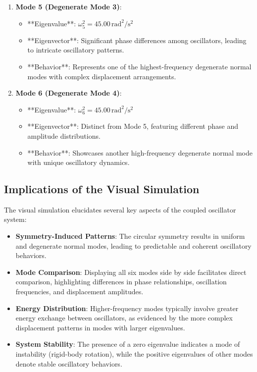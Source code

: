 \documentclass[12pt]{report} %
\begin{document}
\begin{enumerate}
    \item \textbf{Mode 5 (Degenerate Mode 3)}:
    \begin{itemize}
        \item **Eigenvalue**: \( \omega_5^2 = 45.00 \, \text{rad}^2/\text{s}^2 \)
        \item **Eigenvector**: Significant phase differences among oscillators, leading to intricate oscillatory patterns.
        \item **Behavior**: Represents one of the highest-frequency degenerate normal modes with complex displacement arrangements.
    \end{itemize}
    
    \item \textbf{Mode 6 (Degenerate Mode 4)}:
    \begin{itemize}
        \item **Eigenvalue**: \( \omega_6^2 = 45.00 \, \text{rad}^2/\text{s}^2 \)
        \item **Eigenvector**: Distinct from Mode 5, featuring different phase and amplitude distributions.
        \item **Behavior**: Showcases another high-frequency degenerate normal mode with unique oscillatory dynamics.
    \end{itemize}
\end{enumerate}

\subsection{Implications of the Visual Simulation}
\label{subsec:part2_task3_implications}

The visual simulation elucidates several key aspects of the coupled oscillator system:

\begin{itemize}
    \item \textbf{Symmetry-Induced Patterns}: The circular symmetry results in uniform and degenerate normal modes, leading to predictable and coherent oscillatory behaviors.
    
    \item \textbf{Mode Comparison}: Displaying all six modes side by side facilitates direct comparison, highlighting differences in phase relationships, oscillation frequencies, and displacement amplitudes.
    
    \item \textbf{Energy Distribution}: Higher-frequency modes typically involve greater energy exchange between oscillators, as evidenced by the more complex displacement patterns in modes with larger eigenvalues.
    
    \item \textbf{System Stability}: The presence of a zero eigenvalue indicates a mode of instability (rigid-body rotation), while the positive eigenvalues of other modes denote stable oscillatory behaviors.
\end{itemize}
\end{document}
